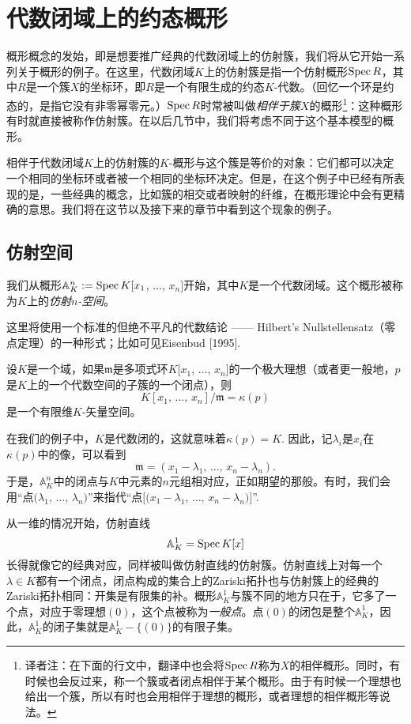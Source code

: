 \section{代数闭域上的约态概形}

概形概念的发始，即是想要推广经典的代数闭域上的仿射簇，我们将从它开始一系列关于概形的例子。在这里，代数闭域$K$上的仿射簇是指一个仿射概形$\operatorname{Spec} R$，其中$R$是一个簇$X$的坐标环，即$R$是一个有限生成的约态$K$\hyp 代数。（回忆一个环是约态的，是指它没有非零幂零元。）$\operatorname{Spec} R$时常被叫做\textit{相伴于簇$X$}的概形\footnote{译者注：在下面的行文中，翻译中也会将$\operatorname{Spec} R$称为$X$的相伴概形。同时，有时候也会反过来，称一个簇或者闭点相伴于某个概形。由于有时候一个理想也给出一个簇，所以有时也会用相伴于理想的概形，或者理想的相伴概形等说法。}：这种概形有时就直接被称作仿射簇。在以后几节中，我们将考虑不同于这个基本模型的概形。

相伴于代数闭域$K$上的仿射簇的$K$\hyp 概形与这个簇是等价的对象：它们都可以决定一个相同的坐标环或者被一个相同的坐标环决定。但是，在这个例子中已经有所表现的是，一些经典的概念，比如簇的相交或者映射的纤维，在概形理论中会有更精确的意思。我们将在这节以及接下来的章节中看到这个现象的例子。

\subsection{仿射空间}

我们从概形$\mathbb{A}^n_K:=\operatorname{Spec} K[x_1$, $\dots$, $x_n]$开始，其中$K$是一个代数闭域。这个概形被称为$K$上的\textit{仿射$n$-空间}。

这里将使用一个标准的但绝不平凡的代数结论 ------ Hilbert's Nullstellensatz（零点定理）的一种形式；比如可见Eisenbud [1995].

\begin{thm}[Nullstellensatz]
	设$K$是一个域，如果$\mathfrak{m}$是多项式环$K[x_1$, $\dots$, $x_n]$的一个极大理想（或者更一般地，$p$是$K$上的一个代数空间的子簇的一个闭点），则
	\[
		K[\text{$x_1$, $\dots$, $x_n$}]/\mathfrak{m}=\kappa(p)
	\]
	是一个有限维$K$\hyp 矢量空间。
\end{thm}

在我们的例子中，$K$是代数闭的，这就意味着$\kappa(p)=K$. 因此，记$\lambda_i$是$x_i$在$\kappa(p)$中的像，可以看到
\[
	\mathfrak{m}=(\text{$x_1-\lambda_1$, $\dots$, $x_n-\lambda_n$}).
\]
于是，$\mathbb{A}^n_K$中的闭点与$K$中元素的$n$元组相对应，正如期望的那般。有时，我们会用“点$(\lambda_1$, $\dots$, $\lambda_n)$”来指代“点$[(x_1-\lambda_1$, $\dots$, $x_n-\lambda_n)]$”. 

从一维的情况开始，仿射直线
\[
	\mathbb{A}^1_K=\operatorname{Spec} K[x]
\]
长得就像它的经典对应，同样被叫做仿射直线的仿射簇。仿射直线上对每一个$\lambda\in K$都有一个闭点，闭点构成的集合上的Zariski拓扑也与仿射簇上的经典的Zariski拓扑相同：开集是有限集的补。概形$\mathbb{A}^1_K$与簇不同的地方只在于，它多了一个点，对应于零理想$(0)$，这个点被称为\textit{一般点}。点$(0)$的闭包是整个$\mathbb{A}^1_K$，因此，$\mathbb{A}^1_K$的闭子集就是$\mathbb{A}^1_K-\{(0)\}$的有限子集。

